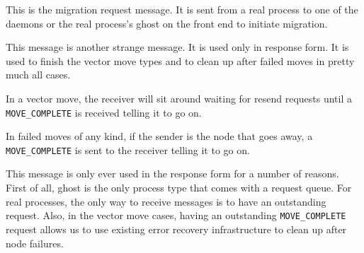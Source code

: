 \begin{description}

  This is the migration request message.  It is sent from a real
  process to one of the daemons or the real process's ghost on the
  front end to initiate migration.

  \begin{reqresp}
  \response
  \end{reqresp}


  This message is another strange message.  It is used only in
  response form.  It is used to finish the vector move types and to
  clean up after failed moves in pretty much all cases.

  In a vector move, the receiver will sit around waiting for resend
  requests until a \texttt{MOVE\_COMPLETE} is received telling it to
  go on.

  In failed moves of any kind, if the sender is the node that goes
  away, a \texttt{MOVE\_COMPLETE} is sent to the receiver telling it
  to go on.

  This message is only ever used in the response form for a number of
  reasons.  First of all, ghost is the only process type that comes
  with a request queue.  For real processes, the only way to receive
  messages is to have an outstanding request.  Also, in the vector
  move cases, having an outstanding \texttt{MOVE\_COMPLETE} request
  allows us to use existing error recovery infrastructure to clean up
  after node failures.


\end{description}
